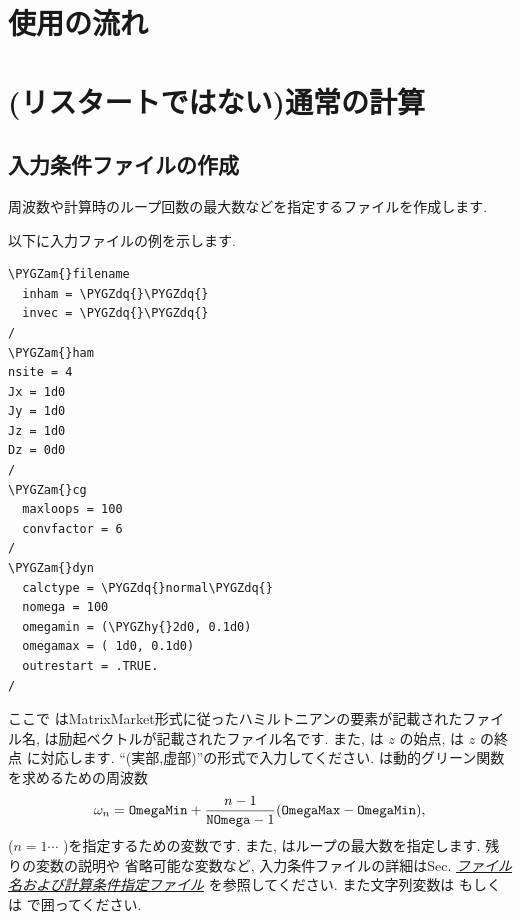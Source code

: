 \documentclass[letterpaper,10pt,dvipdfmx,openany]{sphinxmanual}
\def\PYGZam{\char`\&}
\def\PYGZhy{\char`\-}
\def\PYGZdq{\char`\"}
\begin{document}
\section{使用の流れ}
\label{shiftk_flow_ja:usage}\label{shiftk_flow_ja:id2}

\section{(リスタートではない)通常の計算}
\label{shiftk_flow_ja:id3}

\subsection{入力条件ファイルの作成}
\label{shiftk_flow_ja:id4}
周波数や計算時のループ回数の最大数などを指定するファイルを作成します.

以下に入力ファイルの例を示します.

\begin{Verbatim}[commandchars=\\\{\}]
\PYGZam{}filename
  inham = \PYGZdq{}\PYGZdq{}
  invec = \PYGZdq{}\PYGZdq{}
/
\PYGZam{}ham
nsite = 4
Jx = 1d0
Jy = 1d0
Jz = 1d0
Dz = 0d0
/
\PYGZam{}cg
  maxloops = 100
  convfactor = 6
/
\PYGZam{}dyn
  calctype = \PYGZdq{}normal\PYGZdq{}
  nomega = 100
  omegamin = (\PYGZhy{}2d0, 0.1d0)
  omegamax = ( 1d0, 0.1d0)
  outrestart = .TRUE.
/
\end{Verbatim}

ここで
 はMatrixMarket形式に従ったハミルトニアンの要素が記載されたファイル名,
 は励起ベクトルが記載されたファイル名です. また,
 は \(z\) の始点,
 は \(z\) の終点 に対応します.
``(実部,虚部)''の形式で入力してください.
 は動的グリーン関数を求めるための周波数
\begin{gather}
\begin{split}\begin{align}
\omega_n =  {\tt OmegaMin}
+ \frac{n-1}{{\tt NOmega}-1}({\tt OmegaMax} - {\tt OmegaMin}),
\end{align}\end{split}\notag
\end{gather}
(\(n=1\cdots\) )を指定するための変数です.
また,   はループの最大数を指定します.  残りの変数の説明や
省略可能な変数など, 入力条件ファイルの詳細はSec.
{\hyperref[shiftk_format_ja:modpara]{\emph{ファイル名および計算条件指定ファイル}}} を参照してください.
また文字列変数は  もしくは  で囲ってください.
\end{document}
